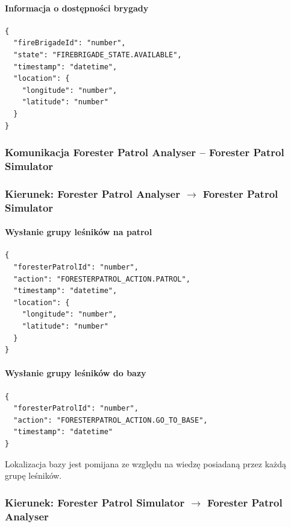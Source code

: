 \documentclass[11pt,a4paper]{article}
\begin{document}
\paragraph{Informacja o dostępności brygady}

\begin{verbatim}
{
  "fireBrigadeId": "number",
  "state": "FIREBRIGADE_STATE.AVAILABLE",
  "timestamp": "datetime",
  "location": {
    "longitude": "number",
    "latitude": "number"
  }
}
\end{verbatim}

\subsubsection{Komunikacja Forester Patrol Analyser -- Forester Patrol Simulator}

\subsubsection*{Kierunek: Forester Patrol Analyser $\rightarrow$ Forester Patrol Simulator}

\paragraph{Wysłanie grupy leśników na patrol}

\begin{verbatim}
{
  "foresterPatrolId": "number",
  "action": "FORESTERPATROL_ACTION.PATROL",
  "timestamp": "datetime",
  "location": {
    "longitude": "number",
    "latitude": "number"
  }
}
\end{verbatim}

\paragraph{Wysłanie grupy leśników do bazy}

\begin{verbatim}
{
  "foresterPatrolId": "number",
  "action": "FORESTERPATROL_ACTION.GO_TO_BASE",
  "timestamp": "datetime"
}
\end{verbatim}

Lokalizacja bazy jest pomijana ze względu na wiedzę posiadaną przez każdą grupę leśników.

\subsubsection*{Kierunek: Forester Patrol Simulator $\rightarrow$ Forester Patrol Analyser}
\end{document}
